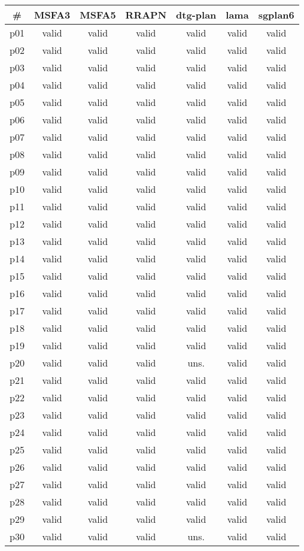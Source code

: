 \begin{tabular}{c||c|c|c|c|c|c}
\textbf{\#} & \textbf{MSFA3} & \textbf{MSFA5} & \textbf{RRAPN} & \textbf{dtg-plan} & \textbf{lama} & \textbf{sgplan6}\\
\hline
\hline
p01 & valid & valid & valid & valid & valid & valid\\
p02 & valid & valid & valid & valid & valid & valid\\
p03 & valid & valid & valid & valid & valid & valid\\
p04 & valid & valid & valid & valid & valid & valid\\
p05 & valid & valid & valid & valid & valid & valid\\
p06 & valid & valid & valid & valid & valid & valid\\
p07 & valid & valid & valid & valid & valid & valid\\
p08 & valid & valid & valid & valid & valid & valid\\
p09 & valid & valid & valid & valid & valid & valid\\
p10 & valid & valid & valid & valid & valid & valid\\
p11 & valid & valid & valid & valid & valid & valid\\
p12 & valid & valid & valid & valid & valid & valid\\
p13 & valid & valid & valid & valid & valid & valid\\
p14 & valid & valid & valid & valid & valid & valid\\
p15 & valid & valid & valid & valid & valid & valid\\
p16 & valid & valid & valid & valid & valid & valid\\
p17 & valid & valid & valid & valid & valid & valid\\
p18 & valid & valid & valid & valid & valid & valid\\
p19 & valid & valid & valid & valid & valid & valid\\
p20 & valid & valid & valid & uns. & valid & valid\\
p21 & valid & valid & valid & valid & valid & valid\\
p22 & valid & valid & valid & valid & valid & valid\\
p23 & valid & valid & valid & valid & valid & valid\\
p24 & valid & valid & valid & valid & valid & valid\\
p25 & valid & valid & valid & valid & valid & valid\\
p26 & valid & valid & valid & valid & valid & valid\\
p27 & valid & valid & valid & valid & valid & valid\\
p28 & valid & valid & valid & valid & valid & valid\\
p29 & valid & valid & valid & valid & valid & valid\\
p30 & valid & valid & valid & uns. & valid & valid\\
\end{tabular}

